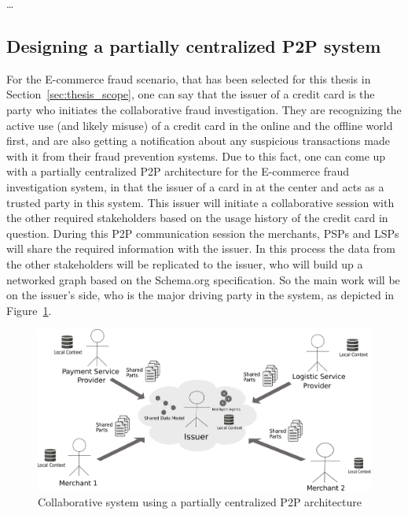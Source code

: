\ldots


\subsection{Designing a partially centralized \gls{P2P} system}
\label{subsec:p2p_partially_centralized_system}

For the \gls{E-commerce} fraud scenario, that has been selected for this thesis in Section~\ref{sec:thesis_scope}, one can say that the issuer of a credit card is the party who initiates the collaborative fraud investigation. They are recognizing the active use (and likely misuse) of a credit card in the online and the offline world first, and are also getting a notification about any suspicious transactions made with it from their fraud prevention systems. Due to this fact, one can come up with a partially centralized \gls{P2P} architecture for the \gls{E-commerce} fraud investigation system, in that the issuer of a card in at the center and acts as a trusted party in this system. This issuer will initiate a collaborative session with the other required stakeholders based on the usage history of the credit card in question. During this \gls{P2P} communication session the merchants, \gls{PSP}s and \gls{LSP}s will share the required information with the issuer. In this process the data from the other stakeholders will be replicated to the issuer, who will build up a networked graph based on the Schema.org specification. So the main work will be on the issuer's side, who is the major driving party in the system, as depicted in Figure~\ref{fig:images_p2p_centralized}.\@

\begin{figure}[H]
	\centering
		\includegraphics[width=0.9\columnwidth]{images/system_P2P_centralized.pdf}
	\caption{Collaborative system using a partially centralized \gls{P2P} architecture}
\label{fig:images_p2p_centralized}
\end{figure}

